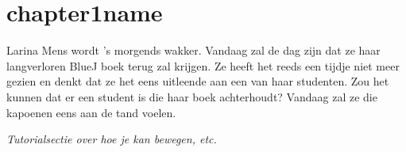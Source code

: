 \section{chapter1name}

Larina Mens wordt 's morgends wakker. Vandaag zal de dag zijn dat ze haar langverloren BlueJ boek terug zal krijgen. Ze heeft het reeds een tijdje niet meer gezien en denkt dat ze het eens uitleende aan een van haar studenten. Zou het kunnen dat er een student is die haar boek achterhoudt? Vandaag zal ze die kapoenen eens aan de tand voelen.

\textit{Tutorialsectie over hoe je kan bewegen, etc.}

